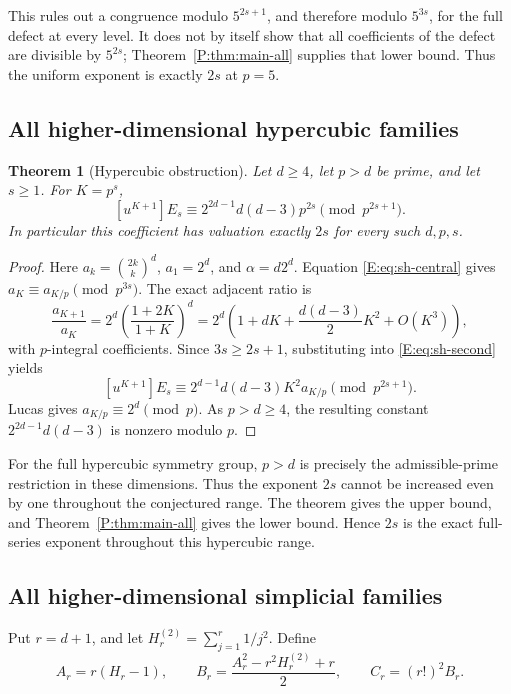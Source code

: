 \documentclass[11pt,a4paper]{article}
\newtheorem{theorem}{Theorem}[section]
\theoremstyle{definition}\newtheorem{definition}[theorem]{Definition}
\theoremstyle{remark}\newtheorem{remark}[theorem]{Remark}
\numberwithin{equation}{section}
\begin{document}
This rules out a congruence modulo $5^{2s+1}$, and therefore modulo
$5^{3s}$, for the full defect at every level.  It does not by itself
show that all coefficients of the defect are divisible by $5^{2s}$; Theorem~\ref{P:thm:main-all} supplies that lower bound. Thus the uniform exponent is exactly $2s$ at $p=5$.

\subsection{All higher-dimensional hypercubic families}

\begin{theorem}[Hypercubic obstruction]
\label{E:thm:sh-cube}
Let $d\geq4$, let $p>d$ be prime, and let $s\geq1$.
For $K=p^s$,
\[
 [u^{K+1}]E_s
 \equiv2^{2d-1}d(d-3)p^{2s}\pmod{p^{2s+1}}.
\]
In particular this coefficient has valuation exactly $2s$ for every
such $d,p,s$.
\end{theorem}
\begin{proof}
Here $a_k=\binom{2k}{k}^d$, $a_1=2^d$, and $\alpha=d2^d$.
Equation \eqref{E:eq:sh-central} gives
$a_K\equiv a_{K/p}\pmod{p^{3s}}$.  The exact adjacent ratio is
\[
 \frac{a_{K+1}}{a_K}
 =2^d\left(\frac{1+2K}{1+K}\right)^d
 =2^d\left(1+dK+\frac{d(d-3)}2K^2+O(K^3)\right),
\]
with $p$-integral coefficients.  Since $3s\geq2s+1$, substituting
into \eqref{E:eq:sh-second} yields
\[
 [u^{K+1}]E_s
 \equiv2^{d-1}d(d-3)K^2a_{K/p}\pmod{p^{2s+1}}.
\]
Lucas gives $a_{K/p}\equiv2^d\pmod p$.
As $p>d\geq4$, the resulting constant
$2^{2d-1}d(d-3)$ is nonzero modulo $p$.
\end{proof}

For the full hypercubic symmetry group, $p>d$ is precisely the
admissible-prime restriction in these dimensions.  Thus the exponent
$2s$ cannot be increased even by one throughout the conjectured range.
The theorem gives the upper bound, and Theorem~\ref{P:thm:main-all} gives the lower bound. Hence $2s$ is the exact full-series exponent throughout this hypercubic range.

\subsection{All higher-dimensional simplicial families}

Put $r=d+1$, and let $H_r^{(2)}=\sum_{j=1}^r1/j^2$.  Define
\[
 A_r=r(H_r-1),\qquad
 B_r=\frac{A_r^2-r^2H_r^{(2)}+r}{2},\qquad
 C_r=(r!)^2B_r.
\]
\end{document}
